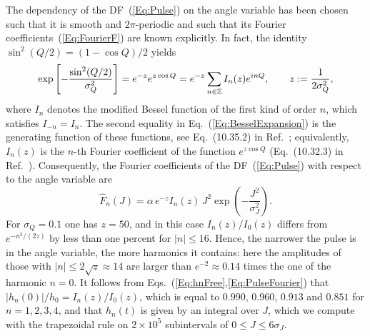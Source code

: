 The dependency of the DF~(\ref{Eq:Pulse}) on the angle variable has been chosen such that it is smooth and $2\pi$-periodic and such that its Fourier coefficients~(\ref{Eq:FourierF}) are known explicitly. In fact, the identity $\sin^2(Q/2) = (1 - \cos Q)/2$ yields
\begin{equation}
\exp\left[ -\frac{\sin^2(Q/2)}{\sigma_Q^2} \right] = e^{-z} e^{z\cos Q}
 = e^{-z}\sum\limits_{n\in\mathbb{Z}} I_n(z) e^{inQ},\qquad
z := \frac{1}{2\sigma_Q^2},
\label{Eq:BesselExpansion}
\end{equation}
where $I_n$ denotes the modified Bessel function of the first kind of order $n$, which satisfies $I_{-n} = I_n$. The second equality in Eq.~(\ref{Eq:BesselExpansion}) is the generating function of these functions, see Eq.~(10.35.2) in Ref.~\cite{DLMF}; equivalently, $I_n(z)$ is the $n$-th Fourier coefficient of the function $e^{z\cos Q}$ (Eq.~(10.32.3) in Ref.~\cite{DLMF}). Consequently, the Fourier coefficients of the DF~(\ref{Eq:Pulse}) with respect to the angle variable are
\begin{equation}
\hat{F}_n(J) = \alpha\, e^{-z} I_n(z)\, J^2\exp\left( -\frac{J^2}{\sigma_J^2} \right).
\label{Eq:PulseFourier}
\end{equation}
For $\sigma_Q = 0.1$ one has $z = 50$, and in this case $I_n(z)/I_0(z)$ differs from $e^{-n^2/(2z)}$ by less than one percent for $|n|\leq 16$. Hence, the narrower the pulse is in the angle variable, the more harmonics it contains: here the amplitudes of those with $|n|\leq 2\sqrt{z}\approx 14$ are larger than $e^{-2}\approx 0.14$ times the one of the harmonic $n = 0$. It follows from Eqs.~(\ref{Eq:hnFree},\ref{Eq:PulseFourier}) that $|h_n(0)|/h_0 = I_n(z)/I_0(z)$, which is equal to $0.990$, $0.960$, $0.913$ and $0.851$ for $n = 1,2,3,4$, and that $h_n(t)$ is given by an integral over $J$, which we compute with the trapezoidal rule on $2\times 10^5$ subintervals of $0\leq J\leq 6\sigma_J$.



